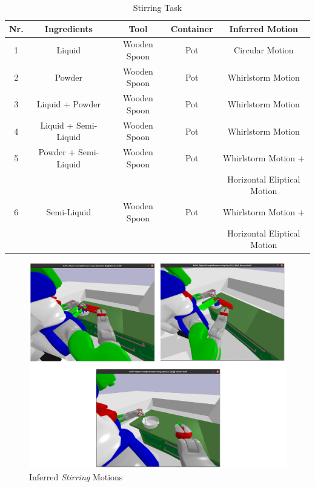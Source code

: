 \begin{table}[H]
  \centering
  \begin{tabular}{|c|c|c|c|c|}
    \hline
    \textbf{Nr.} & \textbf{Ingredients} & \textbf{Tool} & \textbf{Container} & \textbf{Inferred Motion}  \\
    \hline
    1 & Liquid & Wooden Spoon & Pot & Circular Motion \\
    \hline
    2 & Powder & Wooden Spoon & Pot & Whirlstorm Motion\\
    \hline
    3 & Liquid + Powder & Wooden Spoon & Pot & Whirlstorm Motion \\
    \hline
    4 & Liquid + Semi-Liquid & Wooden Spoon & Pot & Whirlstorm Motion \\
    \hline
    5 & Powder + Semi-Liquid & Wooden Spoon & Pot & Whirlstorm Motion +
    \\ & & &  &Horizontal Eliptical Motion \\
    \hline
    6 & Semi-Liquid & Wooden Spoon & Pot & Whirlstorm Motion +
    \\ & & &  &Horizontal Eliptical Motion \\
    \hline
  \end{tabular}
  \caption{Stirring Task}
  \label{tab:mixingtask}
\end{table}
\begin{figure}[H]
  \includegraphics[scale=0.36]{Graphics/stirring_evaluation.jpg}
  \caption{Inferred \textit{Stirring} Motions}
  \label{fig:mixingverb WikiHow}
\end{figure}

